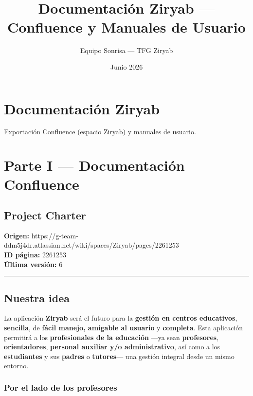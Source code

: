 \documentclass[
  spanish,
  11pt,
]{report}
\title{Documentación Ziryab --- Confluence y Manuales de Usuario}
\author{Equipo Sonrisa --- TFG Ziryab}
\date{Junio 2026}
\begin{document}
\maketitle

{
\setcounter{tocdepth}{2}
\tableofcontents
}
\chapter{Documentación Ziryab}\label{documentaciuxf3n-ziryab}

Exportación Confluence (espacio Ziryab) y manuales de usuario.

\chapter{Parte I --- Documentación
Confluence}\label{parte-i-documentaciuxf3n-confluence}

\section{Project Charter}\label{project-charter}

\textbf{Origen:}
https://g-team-ddm5j4dr.atlassian.net/wiki/spaces/Ziryab/pages/2261253\\
\textbf{ID página:} 2261253\\
\textbf{Última versión:} 6

\begin{center}\rule{0.5\linewidth}{0.5pt}\end{center}

\section{Nuestra idea}\label{nuestra-idea}

La aplicación \textbf{Ziryab} será el futuro para la \textbf{gestión en
centros educativos}, \textbf{sencilla}, de \textbf{fácil manejo,
amigable al usuario} y \textbf{completa}. Esta aplicación permitirá a
los \textbf{profesionales de la educación} ---ya sean
\textbf{profesores}, \textbf{orientadores}, \textbf{personal auxiliar
y/o administrativo}, así como a los \textbf{estudiantes} y sus
\textbf{padres} o \textbf{tutores}--- una gestión integral desde un
mismo entorno.

\subsection{Por el lado de los
profesores}\label{por-el-lado-de-los-profesores}
\end{document}
